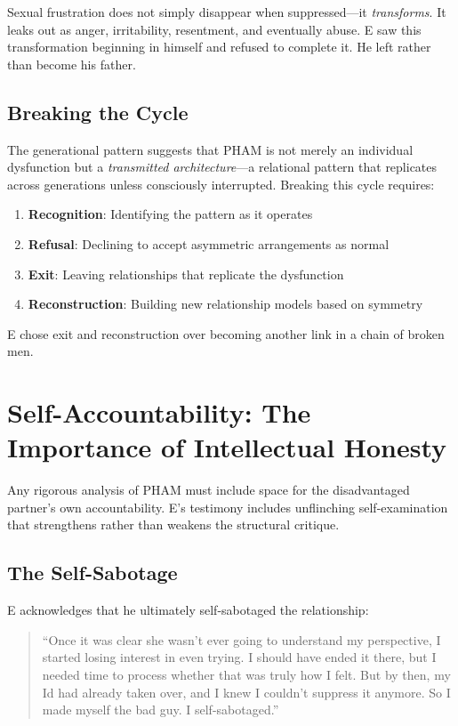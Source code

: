 \documentclass[12pt,openany]{book}
\numberwithin{equation}{chapter}
\begin{document}
Sexual frustration does not simply disappear when suppressed---it \textit{transforms}. It leaks out as anger, irritability, resentment, and eventually abuse. E saw this transformation beginning in himself and refused to complete it. He left rather than become his father.

\subsection{Breaking the Cycle}

The generational pattern suggests that PHAM is not merely an individual dysfunction but a \textit{transmitted architecture}---a relational pattern that replicates across generations unless consciously interrupted. Breaking this cycle requires:

\begin{enumerate}
    \item \textbf{Recognition}: Identifying the pattern as it operates
    \item \textbf{Refusal}: Declining to accept asymmetric arrangements as normal
    \item \textbf{Exit}: Leaving relationships that replicate the dysfunction
    \item \textbf{Reconstruction}: Building new relationship models based on symmetry
\end{enumerate}

E chose exit and reconstruction over becoming another link in a chain of broken men.

\section{Self-Accountability: The Importance of Intellectual Honesty}

Any rigorous analysis of PHAM must include space for the disadvantaged partner's own accountability. E's testimony includes unflinching self-examination that strengthens rather than weakens the structural critique.

\subsection{The Self-Sabotage}

E acknowledges that he ultimately self-sabotaged the relationship:

\begin{quote}
``Once it was clear she wasn't ever going to understand my perspective, I started losing interest in even trying. I should have ended it there, but I needed time to process whether that was truly how I felt. But by then, my Id had already taken over, and I knew I couldn't suppress it anymore. So I made myself the bad guy. I self-sabotaged.''
\end{quote}
\end{document}
